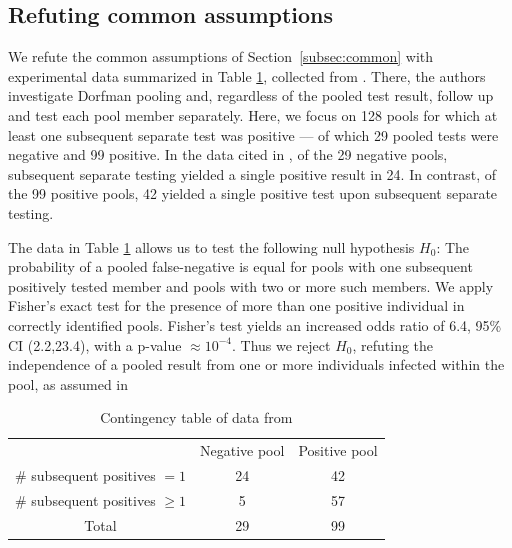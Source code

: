 \documentclass{article}
\begin{document}
\subsection{Refuting common assumptions}\label{subsec:refute}
We refute the common assumptions of Section~\ref{subsec:common} with
experimental data summarized in Table \ref{table}, collected from
\cite{Salazar}. There, the authors investigate Dorfman pooling and,
regardless of the pooled test result, follow up and test each pool
member separately. Here, we focus on 128 pools for which at least one
subsequent separate test was positive --- of which 29 pooled tests
were negative and 99 positive. In the data cited in \cite{Salazar}, of
the 29 negative pools, subsequent separate testing yielded a single
positive result in 24. In contrast, of the 99 positive pools, 42
yielded a single positive test upon subsequent separate testing.

The data in Table \ref{table} allows us to test the following null
hypothesis $H_0$: The probability of a pooled false-negative is equal
for pools with one subsequent positively tested member and pools with
two or more such members. We apply Fisher's exact test for the
presence of more than one positive individual in correctly identified
pools. Fisher's test yields an increased odds ratio of 6.4, 95\% CI
(2.2,23.4), with a p-value $\approx 10^{-4}$. Thus we reject $H_0$,
refuting the independence of a pooled result from one or more
individuals infected within the pool, as assumed in \cite{Simplistic1,
  Simplistic2, OptimalDorfmanPool, Kim}

\begin{table}[h]
\centering
\begin{tabular}{ c c c }
                                & Negative pool  & Positive pool \\%
\# subsequent positives $=1$    & 24             & 42            \\%
\# subsequent positives $\geq1$ & 5              & 57            \\%
 Total                          & 29             & 99            \\%
\end{tabular}
\caption{Contingency table of data from \cite{Salazar}}\label{table}
\end{table}
\end{document}
